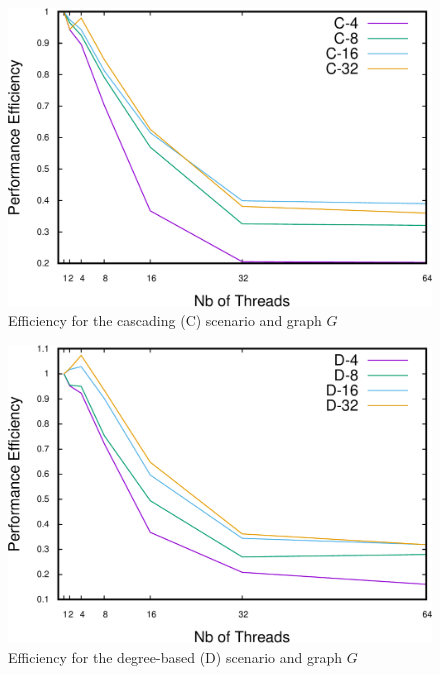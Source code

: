 \begin{figure}
\centering
\includegraphics[scale=0.35]{bench/bench-efficiency/efficiency-c-1-crop.pdf}
\caption{Efficiency for the cascading (C) scenario and graph $G$}
\label{fig:effc1}
\end{figure}

\begin{figure}
\centering
\includegraphics[scale=0.35]{bench/bench-efficiency/efficiency-d-1-crop.pdf}
\caption{Efficiency for the degree-based (D) scenario and graph $G$}
\label{fig:effd1}
\end{figure}


